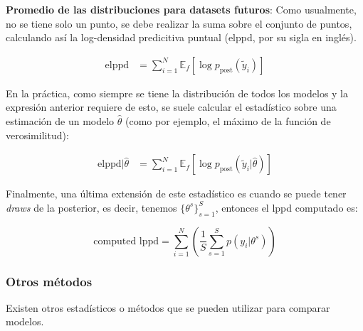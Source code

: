 \textbf{Promedio de las distribuciones para datasets futuros}: Como usualmente, no se tiene solo un punto, se debe realizar la suma sobre el conjunto de puntos, calculando así la log-densidad predicitiva puntual (elppd, por su sigla en inglés).

\begin{align}
\text{elppd} & = \sum_{i=1}^N \mathbb{E}_f[\log p_{\text{post}}(\tilde{y}_i)]
\end{align}

En la práctica, como siempre se tiene la distribución de todos los modelos y la expresión anterior requiere de esto, se suele calcular el estadístico sobre una estimación de un modelo $\hat{\theta}$ (como por ejemplo, el máximo de la función de verosimilitud):

\begin{align}
\text{elppd}|\hat{\theta} & = \sum_{i=1}^N \mathbb{E}_f[\log p_{\text{post}}(\tilde{y}_i|\hat{\theta})]
\end{align}

Finalmente, una última extensión de este estadístico es cuando se puede tener \emph{draws} de la posterior, es decir, tenemos $\{ \theta^s\}_{s=1}^S$, entonces el lppd computado es:

\begin{equation}
\text{computed lppd} = \sum_{i=1}^N \left( \frac{1}{S} \sum_{s=1}^S p(y_i|\theta^s)\right)
\end{equation}

\subsubsection{Otros métodos}
Existen otros estadísticos o métodos que se pueden utilizar para comparar modelos. 

